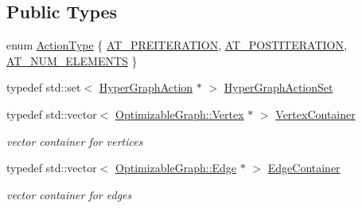 \subsection*{Public Types}
\begin{DoxyCompactItemize}
\item 
enum \mbox{\hyperlink{structg2o_1_1_optimizable_graph_a16d90305c171fe0582c6a8aef40ba89d}{Action\+Type}} \{ \mbox{\hyperlink{structg2o_1_1_optimizable_graph_a16d90305c171fe0582c6a8aef40ba89dad79dc2fea3676bc2e26a83b7aca0cff6}{A\+T\+\_\+\+P\+R\+E\+I\+T\+E\+R\+A\+T\+I\+ON}}, 
\mbox{\hyperlink{structg2o_1_1_optimizable_graph_a16d90305c171fe0582c6a8aef40ba89da6022cb4383dca15d503e600c463c5e5a}{A\+T\+\_\+\+P\+O\+S\+T\+I\+T\+E\+R\+A\+T\+I\+ON}}, 
\mbox{\hyperlink{structg2o_1_1_optimizable_graph_a16d90305c171fe0582c6a8aef40ba89da33b97f5bc80d2e6227c95364573d3651}{A\+T\+\_\+\+N\+U\+M\+\_\+\+E\+L\+E\+M\+E\+N\+TS}}
 \}
\item 
typedef std\+::set$<$ \mbox{\hyperlink{classg2o_1_1_hyper_graph_action}{Hyper\+Graph\+Action}} $\ast$ $>$ \mbox{\hyperlink{structg2o_1_1_optimizable_graph_aa3562ad6794c36ea832095131cfffaac}{Hyper\+Graph\+Action\+Set}}
\item 
typedef std\+::vector$<$ \mbox{\hyperlink{classg2o_1_1_optimizable_graph_1_1_vertex}{Optimizable\+Graph\+::\+Vertex}} $\ast$ $>$ \mbox{\hyperlink{structg2o_1_1_optimizable_graph_a54f01b9b6071e65e6abeebe4afb29dec}{Vertex\+Container}}
\begin{DoxyCompactList}\small\item\em vector container for vertices \end{DoxyCompactList}\item 
typedef std\+::vector$<$ \mbox{\hyperlink{classg2o_1_1_optimizable_graph_1_1_edge}{Optimizable\+Graph\+::\+Edge}} $\ast$ $>$ \mbox{\hyperlink{structg2o_1_1_optimizable_graph_a2b43e807ae6d61ef8749ca1ef7c25f62}{Edge\+Container}}
\begin{DoxyCompactList}\small\item\em vector container for edges \end{DoxyCompactList}\end{DoxyCompactItemize}
